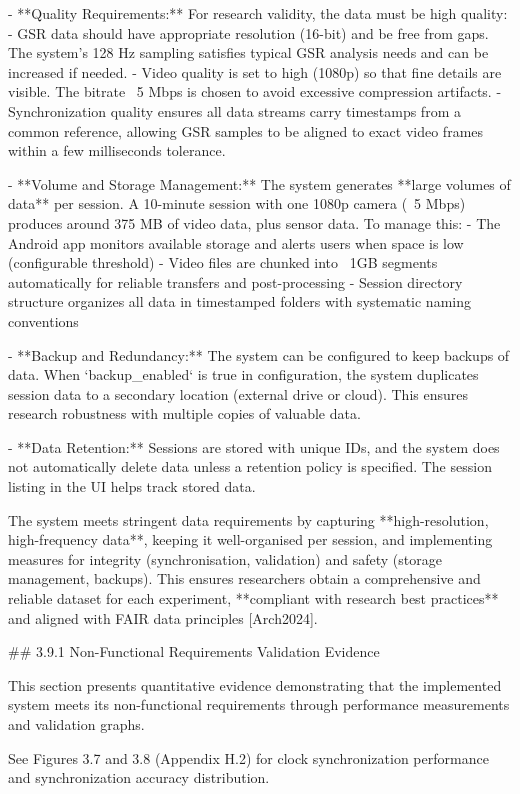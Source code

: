 \documentclass[12pt,a4paper]{article}
\begin{document}
- **Quality Requirements:** For research validity, the data must be high quality:
  - GSR data should have appropriate resolution (16-bit) and be free from gaps. The system's 128 Hz sampling satisfies typical GSR analysis needs and can be increased if needed.
  - Video quality is set to high (1080p) so that fine details are visible. The bitrate ~5 Mbps is chosen to avoid excessive compression artifacts.
  - Synchronization quality ensures all data streams carry timestamps from a common reference, allowing GSR samples to be aligned to exact video frames within a few milliseconds tolerance.

- **Volume and Storage Management:** The system generates **large volumes of data** per session. A 10-minute session with one 1080p camera (~5 Mbps) produces around 375 MB of video data, plus sensor data. To manage this:
  - The Android app monitors available storage and alerts users when space is low (configurable threshold)
  - Video files are chunked into ~1GB segments automatically for reliable transfers and post-processing
  - Session directory structure organizes all data in timestamped folders with systematic naming conventions

- **Backup and Redundancy:** The system can be configured to keep backups of data. When `backup_enabled` is true in configuration, the system duplicates session data to a secondary location (external drive or cloud). This ensures research robustness with multiple copies of valuable data.

- **Data Retention:** Sessions are stored with unique IDs, and the system does not automatically delete data unless a retention policy is specified. The session listing in the UI helps track stored data.

The system meets stringent data requirements by capturing **high-resolution, high-frequency data**, keeping it well-organised per session, and implementing measures for integrity (synchronisation, validation) and safety (storage management, backups). This ensures researchers obtain a comprehensive and reliable dataset for each experiment, **compliant with research best practices** and aligned with FAIR data principles [Arch2024].

## 3.9.1 Non-Functional Requirements Validation Evidence

This section presents quantitative evidence demonstrating that the implemented system meets its non-functional requirements through performance measurements and validation graphs.

See Figures 3.7 and 3.8 (Appendix H.2) for clock synchronization performance and synchronization accuracy distribution.
\end{document}
